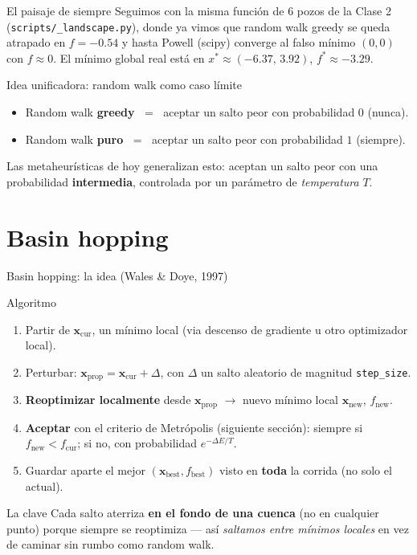 \documentclass[aspectratio=169,10pt]{beamer}
\newcommand{\x}{\mathbf{x}}
\begin{document}
\begin{frame}{El paisaje de siempre}
  Seguimos con la misma función de 6 pozos de la Clase 2
  (\texttt{scripts/\_landscape.py}), donde ya vimos que random walk
  greedy se queda atrapado en $f=-0.54$ y hasta Powell (scipy) converge
  al falso mínimo $(0,0)$ con $f\approx0$. El mínimo global real está en
  $x^*\approx(-6.37,\,3.92)$, $f^*\approx-3.29$.
  \begin{block}{Idea unificadora: random walk como caso límite}
    \begin{itemize}
      \item Random walk \textbf{greedy} $\;=\;$ aceptar un salto peor con
        probabilidad $0$ (nunca).
      \item Random walk \textbf{puro} $\;=\;$ aceptar un salto peor con
        probabilidad $1$ (siempre).
    \end{itemize}
    Las metaheurísticas de hoy generalizan esto: aceptan un salto peor
    con una probabilidad \textbf{intermedia}, controlada por un
    parámetro de \emph{temperatura} $T$.
  \end{block}
\end{frame}

\section{Basin hopping}

\begin{frame}{Basin hopping: la idea (Wales \& Doye, 1997)}
  \begin{block}{Algoritmo}
    \begin{enumerate}
      \item Partir de $\x_{\text{cur}}$, un mínimo local (via descenso de
        gradiente u otro optimizador local).
      \item Perturbar: $\x_{\text{prop}} = \x_{\text{cur}} + \Delta$, con
        $\Delta$ un salto aleatorio de magnitud \texttt{step\_size}.
      \item \textbf{Reoptimizar localmente} desde $\x_{\text{prop}}$
        $\to$ nuevo mínimo local $\x_{\text{new}}$, $f_{\text{new}}$.
      \item \textbf{Aceptar} con el criterio de Metrópolis (siguiente
        sección): siempre si $f_{\text{new}}<f_{\text{cur}}$; si no, con
        probabilidad $e^{-\Delta E/T}$.
      \item Guardar aparte el mejor $(\x_{\text{best}}, f_{\text{best}})$
        visto en \textbf{toda} la corrida (no solo el actual).
    \end{enumerate}
  \end{block}
  \begin{alertblock}{La clave}
    Cada salto aterriza \textbf{en el fondo de una cuenca} (no en
    cualquier punto) porque siempre se reoptimiza — así \emph{saltamos entre
    mínimos locales} en vez de caminar sin rumbo como random walk.
  \end{alertblock}
\end{frame}
\end{document}
